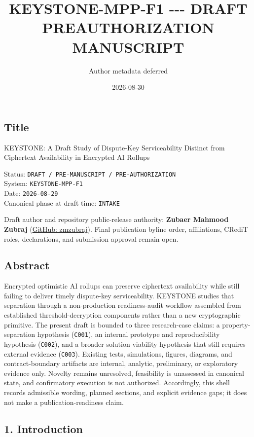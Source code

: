 \documentclass[
]{article}
\title{KEYSTONE-MPP-F1 -\/-\/- DRAFT PREAUTHORIZATION MANUSCRIPT}
\author{Author metadata deferred}
\date{2026-08-30}
\begin{document}
\maketitle

\subsection{Title}\label{title}

KEYSTONE: A Draft Study of Dispute-Key Serviceability Distinct from
Ciphertext Availability in Encrypted AI Rollups

Status: \texttt{DRAFT\ /\ PRE-MANUSCRIPT\ /\ PRE-AUTHORIZATION}\\
System: \texttt{KEYSTONE-MPP-F1}\\
Date: \texttt{2026-08-29}\\
Canonical phase at draft time: \texttt{INTAKE}

Draft author and repository public-release authority: \textbf{Zubaer
Mahmood Zubraj} (\href{https://github.com/zmzubraj}{GitHub: zmzubraj}).
Final publication byline order, affiliations, CRediT roles,
declarations, and submission approval remain open.

\subsection{Abstract}\label{abstract}

Encrypted optimistic AI rollups can preserve ciphertext availability
while still failing to deliver timely dispute-key serviceability.
KEYSTONE studies that separation through a non-production
readiness-audit workflow assembled from established threshold-decryption
components rather than a new cryptographic primitive. The present draft
is bounded to three research-case claims: a property-separation
hypothesis (\texttt{C001}), an internal prototype and reproducibility
hypothesis (\texttt{C002}), and a broader solution-viability hypothesis
that still requires external evidence (\texttt{C003}). Existing tests,
simulations, figures, diagrams, and contract-boundary artifacts are
internal, analytic, preliminary, or exploratory evidence only. Novelty
remains unresolved, feasibility is unassessed in canonical state, and
confirmatory execution is not authorized. Accordingly, this shell
records admissible wording, planned sections, and explicit evidence
gaps; it does not make a publication-readiness claim.

\subsection{1. Introduction}\label{introduction}
\end{document}
